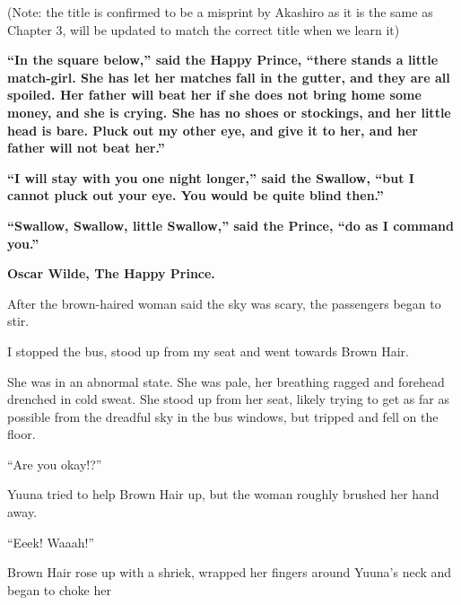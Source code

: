 
(Note: the title is confirmed to be a misprint by Akashiro as it is the same as Chapter 3, will be updated to match the correct title when we learn it)

\begin{center}
\begin{tcolorbox}[width=0.75\textwidth,colback=darkgray,colupper=white]

\textbf{``In the square below,'' said the Happy Prince, ``there stands a little match-girl.  She has let her matches fall in the gutter, and they are all spoiled.  Her father will beat her if she does not bring home some money, and she is crying.  She has no shoes or stockings, and her little head is bare.  Pluck out my other eye, and give it to her, and her father will not beat her.''}

\vspace{\baselineskip}

\textbf{``I will stay with you one night longer,'' said the Swallow, ``but I cannot pluck out your eye.  You would be quite blind then.''}

\vspace{\baselineskip}

\textbf{``Swallow, Swallow, little Swallow,'' said the Prince, ``do as I command you.''}

\bigskip

\textbf{Oscar Wilde, The Happy Prince.}
\end{tcolorbox}
\end{center}

After the brown-haired woman said the sky was scary, the passengers began to stir.

I stopped the bus, stood up from my seat and went towards Brown Hair.

She was in an abnormal state. She was pale, her breathing ragged and forehead drenched in cold sweat. She stood up from her seat, likely trying to get as far as possible from the dreadful sky in the bus windows, but tripped and fell on the floor.

``Are you okay!?''

Yuuna tried to help Brown Hair up, but the woman roughly brushed her hand away.

``Eeek! Waaah!''

Brown Hair rose up with a shriek, wrapped her fingers around Yuuna's neck and began to choke her

